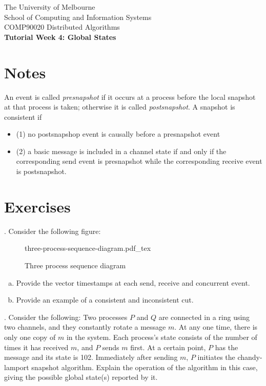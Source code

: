 \documentclass[12pt]{article}
\newcommand{\incfig}[2][1]{%
    \def\svgwidth{#1\columnwidth}
    {#2.pdf_tex}
}
\newcounter{question}
\newcommand{\question}[1]{
    \stepcounter{question}
    \thequestion. #1 \hfill
}
\begin{document}
\begin{center}
    {\sc The University of Melbourne
        \\
        School of Computing and Information Systems
        \\
    COMP90020 Distributed Algorithms}
    \bigskip \\
    {\Large\bf Tutorial Week 4: Global States}
\end{center}
\section*{Notes}

An event is called \textit{presnapshot} if it occurs at a process before the local snapshot at that process is taken; otherwise it is called \textit{postsnapshot}. A snapshot is consistent if

\begin{itemize}
    \item (1) no postsnapshop event is causally before a presnapshot event
    \item (2) a basic message is included in a channel state if and only if the corresponding send event is presnapshot while the corresponding receive event is postsnapshot.
\end{itemize}



\section*{Exercises}

\setcounter{question}{14}

\question{Consider the following figure:


    \begin{figure}[ht]
        \centering
        \incfig{three-process-sequence-diagram}
        \caption{Three process sequence diagram}
        \label{fig:three-process-sequence-diagram}
    \end{figure}

    \begin{enumerate}[(a)]
        \item Provide the vector timestamps at each send, receive and concurrent event.
        \item Provide an example of a consistent and inconsistent cut.
    \end{enumerate}
}

\pagebreak

\question{Consider the following: Two processes $P$ and $Q$ are connected in a ring using two channels, and they constantly rotate a message $m$. At any one time, there is only one copy of $m$ in the system. Each process’s state consists of the number of times it has received $m$, and $P$ sends $m$ first. At a certain point, $P$ has the message and its state is 102. Immediately after sending $m$, $P$ initiates the chandy-lamport snapshot algorithm. Explain the operation of the algorithm in this case, giving the possible global state(s) reported by it.}
\end{document}
